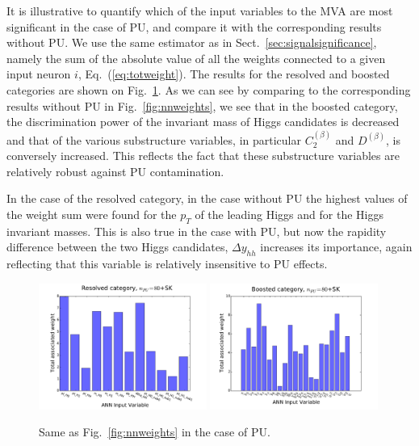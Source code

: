It is illustrative to quantify which of the input variables
to the MVA are most significant in the case of PU,
and compare it with the corresponding
results without PU.
%
We use the same estimator as in Sect.~\ref{sec:signalsignificance},
namely the sum
of the absolute value of all the weights connected to a given
input neuron $i$, Eq.~(\ref{eq:totweight}).
%
The results for the resolved and boosted categories are shown
on Fig.~\ref{fig:nnweights_PU}.
%
As we can see by comparing to the corresponding
results without PU in Fig.~\ref{fig:nnweights}, we see that
in the boosted category, the discrimination power of the invariant
mass of Higgs candidates is decreased and that of the various substructure
variables, in particular $C_2^{(\beta)}$ and
$D^{(\beta)}$, is conversely
increased.
%
This reflects the fact that these substructure variables are
relatively robust against PU contamination.

In the case of the resolved category, in the case without PU the highest
values of the weight sum were found for the $p_T$ of the leading
Higgs and for the Higgs invariant masses.
%
This is also true in the case with PU, but now the rapidity difference
between the two Higgs candidates, $\Delta y_{hh}$ increases its
importance, again reflecting that this variable is relatively
insensitive to PU effects.

\begin{figure}[t]
\begin{center}
\includegraphics[width=0.49\textwidth]{plots/res_wgthist_SKPU80.pdf}
\includegraphics[width=0.49\textwidth]{plots/bst_wgthist_SKPU80.pdf}
\vspace{-0.5cm}
\caption{\small
Same as Fig.~\ref{fig:nnweights} in the case of PU.
}
\label{fig:nnweights_PU}
\end{center}
\end{figure}




